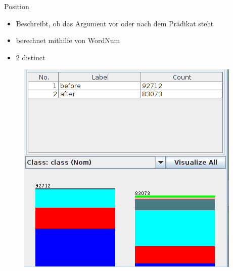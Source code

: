 \documentclass[10pt]{beamer}
\begin{document}
  \begin{frame}{Position}
   \begin{itemize}
    \item Beschreibt, ob das Argument vor oder nach dem Prädikat steht
    \item berechnet mithilfe von WordNum
    \item 2 distinct
   \end{itemize}
   
   \begin{figure}
   	\begin{center}
   		\includegraphics[scale=0.3]{position}
   	\end{center}
   \end{figure}
  \end{frame}
  
\end{document}
